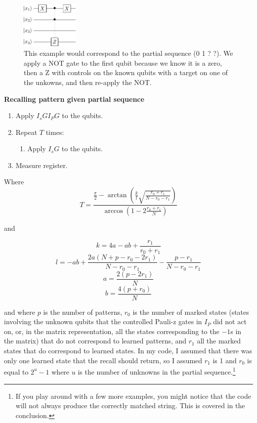 \documentclass[11pt]{report}
\newcommand{\?}{\stackrel{?}{=}}
\begin{document}
\begin{figure}[!htb]
\centering
\includegraphics[width=0.25\textwidth]{resources/pdfs/assoc3-crop.pdf}
\caption{This example would correspond to the partial sequence (0 1 ? ?). We apply a NOT gate to the first qubit because we know it is a zero, then a Z with controls on the known qubits with a target on one of the unkowns, and then re-apply the NOT.}
\label{fig:digraph3}
\end{figure}

\begin{framed}
\textbf{Recalling pattern given partial sequence }
\begin{enumerate}
	\item Apply $I_sGI_PG$ to the qubits.
	\item Repeat $T$ times:
	\begin{enumerate}
		\item Apply $I_sG$ to the qubits.
	\end{enumerate}
	\item Measure register.
\end{enumerate}
\end{framed}

Where $$T=\frac{\frac{\pi}{2}-\arctan \left (\frac{k}{l}\sqrt{\frac{r_0+r_1}{N-r_0-r_1}} \right )}{\arccos \left ( 1-2\frac{r_0+r_1}{N} \right )}$$

and

$$k=4a-ab+\frac{r_1}{r_0+r_1}$$
$$l=-ab+\frac{2a(N+p-r_0-2r_1)}{N-r_0-r_1}-\frac{p-r_1}{N-r_0-r_1}$$
$$a=\frac{2(p-2r_1)}{N}$$
$$b=\frac{4(p+r_0)}{N}$$

and where $p$ is the number of patterns, $r_0$ is the number of marked states (states involving the unknown qubits that the controlled Pauli-z gates in $I_P$ did not act on, or, in the matrix representation, all the states corresponding to the $-1$s in the matrix) that do not correspond to learned patterns, and $r_1$ all the marked states that do correspond to learned states. In my code, I assumed that there was only one learned state that the recall should return, so I assumed $r_1$ is 1 and $r_0$ is equal to $2^u-1$ where $u$ is the number of unknowns in the partial sequence.\footnote{If you play around with a few more examples, you might notice that the code will not always produce the correctly matched string. This is covered in the conclusion.}
\end{document}
